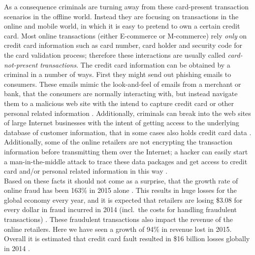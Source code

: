 As a consequence criminals are turning away from these card-present transaction scenarios in the offline world. Instead they are focusing on transactions in the online and mobile world, in which it is easy to pretend to own a certain credit card. Most online transactions (either \gls{E-commerce} or \gls{M-commerce}) rely \emph{only} on credit card information such as card number, card holder and security code for the card validation process; therefore these interactions are usually called \emph{card-not-present transactions}. The credit card information can be obtained by a criminal in a number of ways. First they might send out phishing emails to consumers. These emails mimic the look-and-feel of emails from a merchant or bank, that the consumers are normally interacting with, but instead navigate them to a malicious web site with the intend to capture credit card or other personal related information \citep{ConsumerAction2009}. Additionally, criminals can break into the web sites of large Internet businesses with the intent of getting access to the underlying database of customer information, that in some cases also holds credit card data \citep{Holmes2015}. Additionally, some of the online retailers are not encrypting the transaction information before transmitting them over the Internet; a hacker can easily start a man-in-the-middle attack to trace these data packages and get access to credit card and/or personal related information in this way \citep{Captain2015}. \\

Based on these facts it should not come as a surprise, that the growth rate of online fraud has been 163\% in 2015 alone \citep{PYMNTS2016}. This results in huge losses for the global economy every year, and it is expected that retailers are losing \$3.08 for every dollar in fraud incurred in 2014 (incl.\ the costs for handling fraudulent transactions) \citep{Rampton2015}. These fraudulent transactions also impact the revenue of the online retailers. Here we have seen a growth of 94\% in revenue lost in 2015. Overall it is estimated that credit card fault resulted in \$16 billion losses globally in 2014 \citep{PYMNTS2016} \citep{BusinessWire2015}. \\


